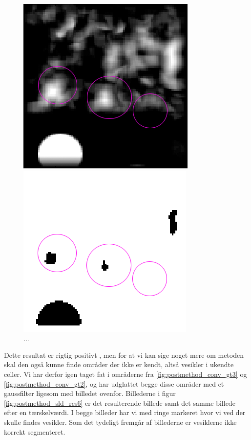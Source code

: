 \begin{figure}[H]
	\begin{minipage}[b]{0.5\linewidth}
		\centering
		\includegraphics[scale=0.54]{files/postmethod/img/sld_res5.png}
	\end{minipage}
	\hspace{0.8cm}
	\begin{minipage}[b]{0.5\linewidth}
		\centering
		\includegraphics[scale=0.54]{files/postmethod/img/sld_res6.png}
	\end{minipage}
	\caption{...\label{fig:postmethod_sld_res5}}
\end{figure}

Dette resultat er rigtig positivt , men for at vi kan sige noget mere om metoden skal den også kunne finde områder der ikke er kendt, altså vesikler i ukendte celler. Vi har derfor igen taget fat i områderne fra \ref{fig:postmethod_conv_gt3} og \ref{fig:postmethod_conv_gt2}, og har udglattet begge disse områder med et gaussfilter ligesom med billedet ovenfor. Billederne i figur \ref{fig:postmethod_sld_res6} er det resulterende billede samt det samme billede efter en tærskelværdi. I begge billeder har vi med ringe markeret hvor vi ved der skulle findes vesikler. Som det tydeligt fremgår af billederne er vesiklerne ikke korrekt segmenteret.

